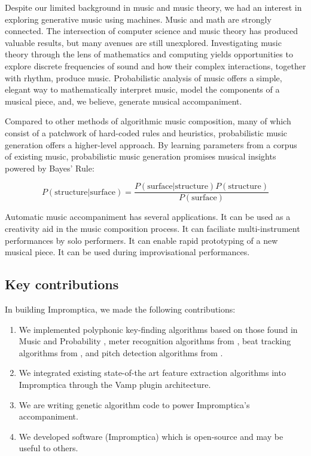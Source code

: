 \documentclass[11pt,conference,letterpaper]{IEEEtran}
\begin{document}
Despite our limited background in music and music theory, we had an interest in exploring generative music using machines. Music and math are strongly connected. The intersection of computer science and music theory has produced valuable results, but many avenues are still unexplored. Investigating music theory through the lens of mathematics and computing yields opportunities to explore discrete frequencies of sound and how their complex interactions, together with rhythm, produce music. Probabilistic analysis of music offers a simple, elegant way to mathematically interpret music, model the components of a musical piece, and, we believe, generate musical accompaniment.

Compared to other methods of algorithmic music composition, many of which consist of a patchwork of hard-coded rules and heuristics, probabilistic music generation offers a higher-level approach. By learning parameters from a corpus of existing music, probabilistic music generation promises musical insights powered by Bayes' Rule:

{\small
  \[ P(\text{structure}|\text{surface}) = \frac{P(\text{surface}|\text{structure})P(\text{structure})}{P(\text{surface})} \]
}

Automatic music accompaniment has several applications. It can be used as a creativity aid in the music composition process. It can faciliate multi-instrument performances by solo performers. It can enable rapid prototyping of a new musical piece. It can be used during improvisational performances.

\subsection{Key contributions}

In building Impromptica, we made the following contributions:

\begin{enumerate}
        \item{We implemented polyphonic key-finding algorithms based on those found in Music and Probability \cite{temperly2007mprob}, meter recognition algorithms from \cite{klapuri2006analysis}, beat tracking algorithms from \cite{ellis2007beat}, and pitch detection algorithms from \cite{klapuri2003multiple}.}
        \item{We integrated existing state-of-the art feature extraction algorithms into Impromptica through the Vamp plugin architecture.}
        \item{We are writing genetic algorithm code to power Impromptica's accompaniment.}
        \item{We developed software (Impromptica) which is open-source and may be useful to others.}
\end{enumerate}
\end{document}

